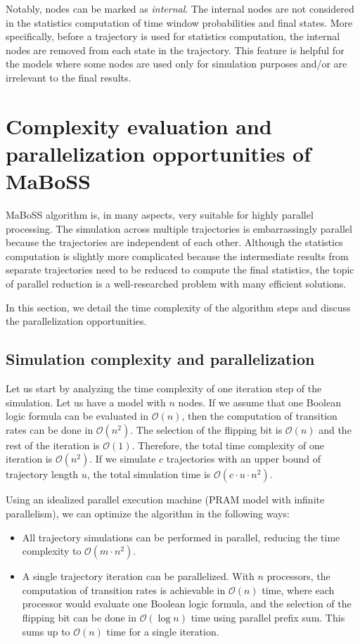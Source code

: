 \documentclass[times, twoside]{zHenriquesLab-StyleBioRxiv}
\begin{document}
Notably, nodes can be marked as \emph{internal}. The internal nodes are not considered in the statistics computation of time window probabilities and final states. More specifically, before a trajectory is used for statistics computation, the internal nodes are removed from each state in the trajectory.
This feature is helpful for the models where some nodes are used only for simulation purposes and/or are irrelevant to the final results.


\section*{Complexity evaluation and parallelization opportunities of MaBoSS}

MaBoSS algorithm is, in many aspects, very suitable for highly parallel processing. The simulation across multiple trajectories is embarrassingly parallel because the trajectories are independent of each other. Although the statistics computation is slightly more complicated because the intermediate results from separate trajectories need to be reduced to compute the final statistics, the topic of parallel reduction is a well-researched problem with many efficient solutions. 

In this section, we detail the time complexity of the algorithm steps and discuss the parallelization opportunities.

\subsection*{Simulation complexity and parallelization}

Let us start by analyzing the time complexity of one iteration step of the simulation. Let us have a model with $n$ nodes. If we assume that one Boolean logic formula can be evaluated in $\mathcal{O}(n)$, then the computation of transition rates can be done in $\mathcal{O}(n^2)$. The selection of the flipping bit is $\mathcal{O}(n)$ and the rest of the iteration is $\mathcal{O}(1)$. Therefore, the total time complexity of one iteration is $\mathcal{O}(n^2)$. If we simulate $c$ trajectories with an upper bound of trajectory length $u$, the total simulation time is $\mathcal{O}(c \cdot u \cdot n^2)$. 

Using an idealized parallel execution machine (PRAM model with infinite parallelism), we can optimize the algorithm in the following ways: 
\begin{itemize}
    \item All trajectory simulations can be performed in parallel, reducing the time complexity to $\mathcal{O}(m \cdot n^2)$.
    \item A single trajectory iteration can be parallelized. With $n$ processors, the computation of transition rates is achievable in $\mathcal{O}(n)$ time, where each processor would evaluate one Boolean logic formula, and the selection of the flipping bit can be done in $\mathcal{O}(\log{n})$ time using parallel prefix sum. This sums up to $\mathcal{O}(n)$ time for a single iteration. 
\end{itemize}
\end{document}
